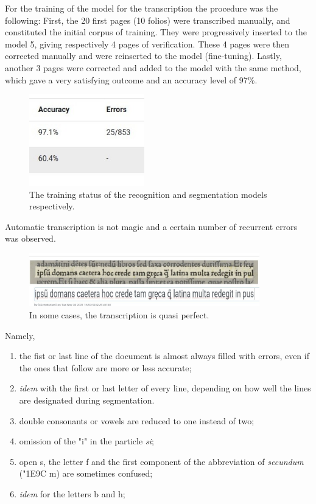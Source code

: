 \documentclass[12pt,twoside]{article}
\begin{document}
For the training of the model for the transcription the procedure was the following:
First, the 20 first pages (10 folios) were transcribed manually, and constituted the initial corpus of training. They were progressively inserted to the model 5, giving respectively 4 pages of verification. These 4 pages were then corrected manually and were reinserted to the model (fine-tuning). Lastly, another 3 pages were corrected and added to the model with the same method, which gave a very satisfying outcome and an accuracy level of 97\%.
\begin{figure}[!h]
    \centering
    \includegraphics[width=5cm]{training_status.jpg}
    \caption{The training status of the recognition and segmentation models respectively.}
    \label{fig:ThirdFigure}
\end{figure}

Automatic transcription is not magic and a certain number of recurrent errors was observed.
\begin{figure}[!h]
    \centering
    \includegraphics[width=10cm]{good_transcription.jpg}
    \caption{In some cases, the transcription is quasi perfect.}
    \label{fig:SecFigure}
\end{figure}

Namely, 
\begin{enumerate}
    \item the fist or last line of the document is almost always filled with errors, even if the ones that follow are more or less accurate;
    \item \textit{idem} with the first or last letter of every line, depending on how well the lines are designated during segmentation.
    \item double consonants or vowels are reduced to one instead of two;
    \item omission of the "i" in the particle \textit{si};
    \item open s, the letter f and the first component of the abbreviation of \textit{secundum} (\char"1E9C m) are sometimes confused;
    \item \textit{idem} for the letters b and h;
\end{enumerate}
\end{document}
